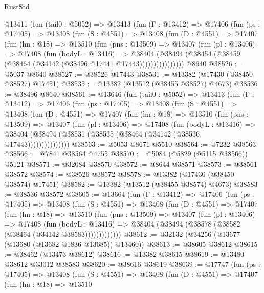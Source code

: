 \begin{lexlean}{RustStd}
\begin{coremodule}
    @13411
      (fun (tail0 : @5052) =>
      @13413
        (fun (Γ : @13412) =>
        @17406
          (fun (ps : @17405) =>
          @13408
            (fun (S : @4551) =>
            @13408
              (fun (D : @4551) =>
              @17407
                (fun (hn : @18) =>
                @13510
                  (fun (pns : @13509) =>
                  @13407
                    (fun (pl : @13406) =>
                    @17408
                      (fun (bodyL : @13416) =>
                      @38404
                        (@38494
                          (@38454 (@38459 (@38464 (@34142 (@38496 @17441 @17443))))))))))))))))
    @8640
@38526 := @5037 @8640
@38527 := @38526 @17443
@38531 := @13382 (@17430 (@38450 @38527) @17451)
@38535 := @13382 (@13512 (@38455 @38527) @4673)
@38536 := @38496 @8640
@38561 := @13646
    (fun (tail0 : @5052) =>
    @13413
      (fun (Γ : @13412) =>
      @17406
        (fun (ps : @17405) =>
        @13408
          (fun (S : @4551) =>
          @13408
            (fun (D : @4551) =>
            @17407
              (fun (hn : @18) =>
              @13510
                (fun (pns : @13509) =>
                @13407
                  (fun (pl : @13406) =>
                  @17408
                    (fun (bodyL : @13416) =>
                    @38404 (@38494 (@38531 (@38535 (@38464 (@34142 (@38536 @17443)))))))))))))))
@38563 := @5053 @8671 @5510
@38564 := @7232 @38563
@38566 := @7841 @38564 @4755
@38570 := @5084 (@5829 (@5115 @38566)) @5121
@38571 := @32084 @38570
@38572 := @8644 @38571
@38573 := @38561 @38572
@38574 := @38526 @38572
@38578 := @13382 (@17430 (@38450 @38574) @17451)
@38582 := @13382 (@13512 (@38455 @38574) @4673)
@38583 := @38536 @38572
@38605 := @13664
    (fun (Γ : @13412) =>
    @17406
      (fun (ps : @17405) =>
      @13408
        (fun (S : @4551) =>
        @13408
          (fun (D : @4551) =>
          @17407
            (fun (hn : @18) =>
            @13510
              (fun (pns : @13509) =>
              @13407
                (fun (pl : @13406) =>
                @17408
                  (fun (bodyL : @13416) =>
                  @38404 (@38494 (@38578 (@38582 (@38464 (@34142 @38583)))))))))))))
@38612 := @32132 (@34256 (@13677 (@13680 (@13682 @1836 @13685)) @13460))
@38613 := @38605 @38612
@38615 := @38462 (@13473 @38612)
@38616 := @13382 @38615
@38619 := @13480 @38612 @33012 @38583
@38620 := @38616 @38619
@38639 := @17747
    (fun (ps : @17405) =>
    @13408
      (fun (S : @4551) =>
      @13408
        (fun (D : @4551) =>
        @17407
          (fun (hn : @18) =>
          @13510

\end{coremodule}
\end{lexlean}
